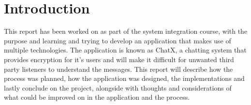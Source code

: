\section{Introduction}

This report has been worked on as part of the system integration course, with the purpose and learning and trying to develop an application that makes use of multiple technologies. The application is known as ChatX, a chatting system that provides encryption for it's users and will make it difficult for unwanted third party listeners to understand the messages. This report will describe how the process was planned, how the application was designed, the implementations and lastly conclude on the project, alongside with thoughts and considerations of what could be improved on in the application and the process.